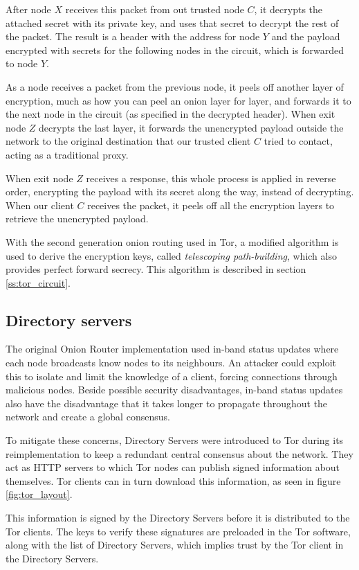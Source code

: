 \documentclass{article}
\begin{document}
		After node $X$ receives this packet from out trusted node $C$, it decrypts the attached secret with its private key, and uses that secret to decrypt the rest of the packet. The result is a header with the address for node $Y$ and the payload encrypted with secrets for the following nodes in the circuit, which is forwarded to node $Y$.
					
		As a node receives a packet from the previous node, it peels off another layer of encryption, much as how you can peel an onion layer for layer, and forwards it to the next node in the circuit (as specified in the decrypted header). When exit node $Z$ decrypts the last layer, it forwards the unencrypted payload outside the network to the original destination that our trusted client $C$ tried to contact, acting as a traditional proxy.
					
		When exit node $Z$ receives a response, this whole process is applied in reverse order, encrypting the payload with its secret along the way, instead of decrypting. When our client $C$ receives the packet, it peels off all the encryption layers to retrieve the unencrypted payload.
		
		With the second generation onion routing used in Tor, a modified algorithm is used to derive the encryption keys, called \emph{telescoping path-building}, which also provides perfect forward secrecy. This algorithm is described in section \ref{ss:tor_circuit}.
				
	\subsection{Directory servers}
		The original Onion Router implementation used in-band status updates where each node broadcasts know nodes to its neighbours. An attacker could exploit this to isolate and limit the knowledge of a client, forcing connections through malicious nodes. Beside possible security disadvantages, in-band status updates also have the disadvantage that it takes longer to propagate throughout the network and create a global consensus.
					
		To mitigate these concerns, Directory Servers were introduced to Tor during its reimplementation to keep a redundant central consensus about the network. They act as HTTP servers to which Tor nodes can publish signed information about themselves. Tor clients can in turn download this information, as seen in figure \ref{fig:tor_layout}.
					
		This information is signed by the Directory Servers before it is distributed to the Tor clients. The keys to verify these signatures are preloaded in the Tor software, along with the list of Directory Servers, which implies trust by the Tor client in the Directory Servers.
\end{document}
